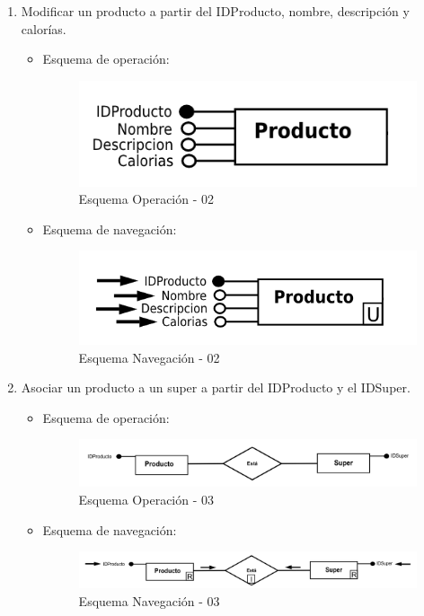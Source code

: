\documentclass[a4paper,12pt]{report}
\begin{document}
\begin{enumerate}
\item Modificar un producto a partir del IDProducto, nombre,
descripción y calorías.
\begin{itemize}
\item Esquema de operación:
\begin{figure}[!htp]
\centering
\includegraphics[width=0.9\linewidth]{./operaciones/img/Productos/02_ope.png}
\caption{Esquema Operación - 02}
\label{fig:ope02}
\medskip
\footnotesize
{}
\end{figure}
\item Esquema de navegación:
\begin{figure}[!htp]
\centering
\includegraphics[width=0.9\linewidth]{./operaciones/img/Productos/02_nav.png}
\caption{Esquema Navegación - 02}
\label{fig:nave02}
\medskip
\footnotesize
{}
\end{figure}
\end{itemize}

\item Asociar un producto a un super a partir del IDProducto y el IDSuper.
\begin{itemize}
\item Esquema de operación:
\begin{figure}[!htp]
\centering
\includegraphics[width=0.9\linewidth]{./operaciones/img/Productos/03_ope.png}
\caption{Esquema Operación - 03}
\label{fig:ope03}
\medskip
\footnotesize
{}
\end{figure}
\item Esquema de navegación:
\begin{figure}[!htp]
\centering
\includegraphics[width=0.9\linewidth]{./operaciones/img/Productos/03_nav.png}
\caption{Esquema Navegación - 03}
\label{fig:nave02}
\medskip
\footnotesize
{}
\end{figure}
\end{itemize}
\end{enumerate}
\end{document}
